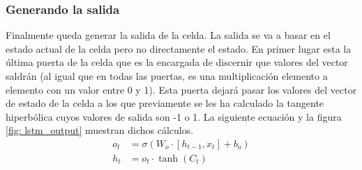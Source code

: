 \subsubsection{Generando la salida}
Finalmente queda generar la salida de la celda. La salida se va a basar en el estado actual de la celda pero no directamente el estado. En primer lugar esta la última puerta de la celda que es la encargada de discernir que valores del vector saldrán (al igual que en todas las puertas, es una multiplicación elemento a elemento con un valor entre 0 y 1). Esta puerta dejará pasar los valores del vector de estado de la celda a los que previamente se les ha calculado la tangente hiperbólica cuyos valores de salida son -1 o 1. La siguiente ecuación y la figura \ref{fig: lstm_output} muestran dichos cálculos.
\begin{align}
	o_t &= \sigma \left( W_o\cdot \left[ h_{t-1}, x_t \right] + b_o \right) \\ \nonumber
	{h_t}&=o_t\cdot \tanh \left( C_t \right)
\end{align}
\vspace*{-35pt}
